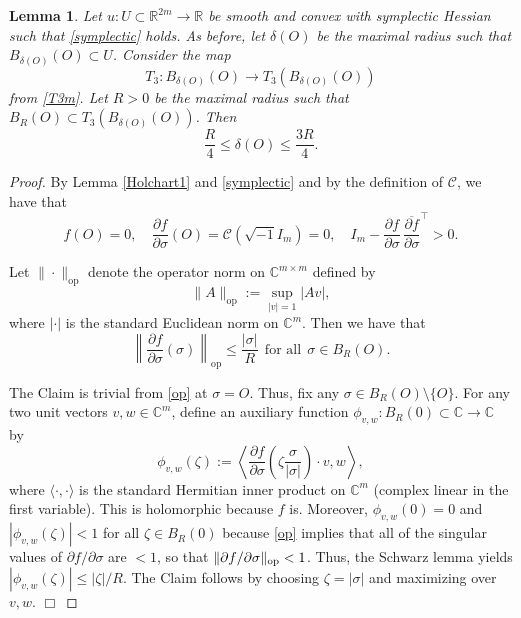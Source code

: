 \documentclass[11pt,reqno]{amsart}
\newcommand{\C}{\mathbb{C}}
\newcommand{\R}{\mathbb{R}}
\renewcommand{\leq}{\leqslant}
\theoremstyle{plain}
\newtheorem{lemma}[theorem]{Lemma}
\theoremstyle{definition}
\numberwithin{equation}{section}
\begin{document}
\begin{lemma}\label{3NN}
Let $u:U\subset\R^{2m}\to\R$ be smooth and convex with symplectic Hessian such that \eqref{symplectic} holds. As before, let $\delta(O)$ be the maximal radius such that $B_{\delta(O)}(O)\subset U$. Consider the map $$T_{3}:B_{\delta(O)}(O)\to T_{3}(B_{\delta(O)}(O))$$
from \eqref{T3m}. Let $R>0$ be the maximal radius such that $B_R(O)\subset T_{3}(B_{\delta(O)}(O))$. Then
$$\frac{R}{4}\leq \delta(O)\leq \frac{3R}{4}.$$
\end{lemma}

\begin{proof}
By Lemma \ref{Holchart1} and \eqref{symplectic} and by the definition of $\mathscr{C}$, we have that 
\begin{equation}\label{op}
    f(O) = 0, \quad \frac{\partial f}{\partial \sigma}(O) = \mathscr{C}(\sqrt{-1}I_m) = 0, \quad I_{m}-\frac{\partial f}{\partial \sigma}\,\overline{\frac{\partial f}{\partial \sigma}}^{\top}>0.
\end{equation}

 Let $\|\cdot\|_{\operatorname{op}}$ denote the operator norm on $\C^{m\times m}$ defined by 
$$\|A\|_{\operatorname{op}}:=\sup_{|v|=1} |Av|,$$ 
where $|\cdot|$ is the standard Euclidean norm on $\C^{m}$. Then we have that 
$$\left\| \frac{\partial f}{\partial \sigma}(\sigma)\right\|_{\operatorname{op}}\leq \frac{|\sigma|}{R}\;\,\text{for all}\;\,\sigma \in B_R(O).$$

The Claim is trivial from \eqref{op} at $\sigma = O$. Thus, fix any $\sigma\in B_{R}(O)\setminus\{O\} $. For any two unit vectors $v,w\in \C^{m}$, define an auxiliary function $\phi_{v,w}:B_{R}(0)\subset\C\to \C$ by
$$\phi_{v,w}(\zeta):= \left\langle \frac{\partial f}{\partial \sigma}\left(\zeta \frac{\sigma}{|\sigma|}\right) \cdot v,w \right\rangle,$$
where $\langle \cdot, \cdot \rangle$ is the standard Hermitian inner product on $\mathbb{C}^m$ (complex linear in the first variable).
This is holomorphic because $f$ is. Moreover, $\phi_{v,w}(0) = 0$ and $|\phi_{v,w}(\zeta)| < 1$ for all $\zeta \in B_R(0)$ because \eqref{op} implies that all of the singular values of $\partial f/\partial \sigma$ are $< 1$, so that $\|\partial f/\partial \sigma\|_{\rm op} < 1$. Thus, the Schwarz lemma yields $|\phi_{v,w}(\zeta)| \leq |\zeta|/R$. The Claim follows by choosing $\zeta = |\sigma|$ and maximizing over $v,w$. \hfill $\Box$\medskip


\end{proof}
\end{document}
